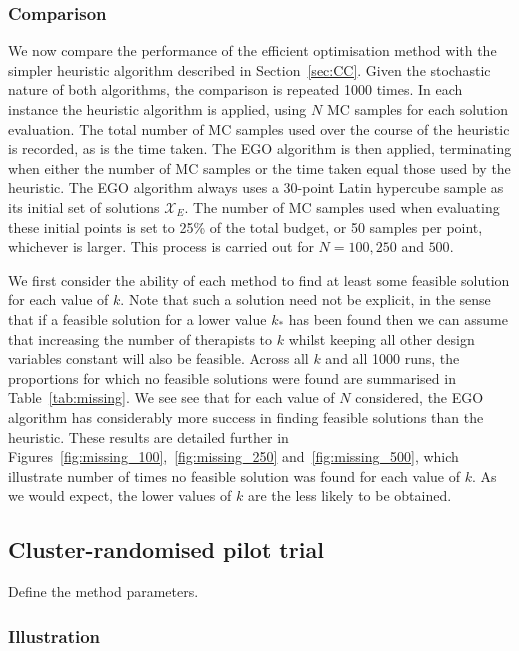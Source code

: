 \documentclass{article} %
\begin{document}
\subsubsection{Comparison}

We now compare the performance of the efficient optimisation method with the simpler heuristic algorithm described in Section~\ref{sec:CC}. Given the stochastic nature of both algorithms, the comparison is repeated 1000 times. In each instance the heuristic algorithm is applied, using $N$ MC samples for each solution evaluation. The total number of MC samples used over the course of the heuristic is recorded, as is the time taken. The EGO algorithm is then applied, terminating when either the number of MC samples or the time taken equal those used by the heuristic. The EGO algorithm always uses a 30-point Latin hypercube sample as its initial set of solutions $\mathcal{X}_{E}$. The number of MC samples used when evaluating these initial points is set to 25\% of the total budget, or 50 samples per point, whichever is larger. This process is carried out for $N = 100, 250$ and $500$.

We first consider the ability of each method to find at least some feasible solution for each value of $k$. Note that such a solution need not be explicit, in the sense that if a feasible solution for a lower value $k_{*}$ has been found then we can assume that increasing the number of therapists to $k$ whilst keeping all other design variables constant will also be feasible. Across all $k$ and all 1000 runs, the proportions for which no feasible solutions were found are summarised in Table~\ref{tab:missing}. We see see that for each value of $N$ considered, the EGO algorithm has considerably more success in finding feasible solutions than the heuristic. These results are detailed further in Figures~\ref{fig:missing_100},~\ref{fig:missing_250} and~\ref{fig:missing_500}, which illustrate number of times no feasible solution was found for each value of $k$. As we would expect, the lower values of $k$ are the less likely to be obtained.




\subsection{Cluster-randomised pilot trial}

Define the method parameters.

\subsubsection{Illustration}
\end{document}
